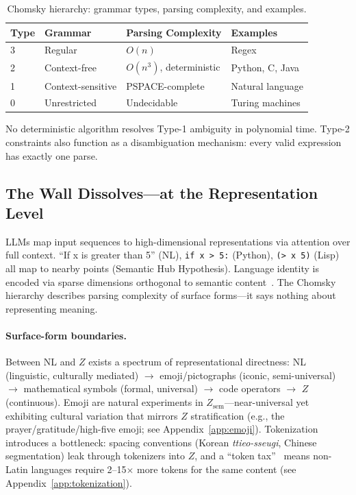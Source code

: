 \documentclass[11pt]{article}
\theoremstyle{definition}
\newcommand{\Zsem}{Z_{\text{sem}}}
\begin{document}
\begin{table}[t]
\centering
\caption{Chomsky hierarchy: grammar types, parsing complexity, and examples.}
\label{tab:chomsky}
\small
\begin{tabular}{llll}
\toprule
\textbf{Type} & \textbf{Grammar} & \textbf{Parsing Complexity} & \textbf{Examples} \\
\midrule
3 & Regular & $O(n)$ & Regex \\
2 & Context-free & $O(n^3)$, deterministic & Python, C, Java \\
1 & Context-sensitive & PSPACE-complete & Natural language \\
0 & Unrestricted & Undecidable & Turing machines \\
\bottomrule
\end{tabular}
\end{table}

No deterministic algorithm resolves Type-1 ambiguity in polynomial time. Type-2 constraints also function as a disambiguation mechanism: every valid expression has exactly one parse.

\subsection{The Wall Dissolves---at the Representation Level}

LLMs map input sequences to high-dimensional representations via attention over full context. ``If x is greater than 5'' (NL), \texttt{if x > 5:} (Python), \texttt{(> x 5)} (Lisp) all map to nearby points (Semantic Hub Hypothesis). Language identity is encoded via sparse dimensions orthogonal to semantic content~\cite{zhong2025sparse}. The Chomsky hierarchy describes parsing complexity of surface forms---it says nothing about representing meaning.

\paragraph{Surface-form boundaries.}
Between NL and $Z$ exists a spectrum of representational directness: NL (linguistic, culturally mediated) $\to$ emoji/pictographs (iconic, semi-universal) $\to$ mathematical symbols (formal, universal) $\to$ code operators $\to$ $Z$ (continuous). Emoji are natural experiments in $\Zsem$---near-universal yet exhibiting cultural variation that mirrors $Z$ stratification (e.g., the prayer/gratitude/high-five emoji; see Appendix~\ref{app:emoji}). Tokenization introduces a bottleneck: spacing conventions (Korean \emph{ttieo-sseugi}, Chinese segmentation) leak through tokenizers into $Z$, and a ``token tax''~\cite{petrov2024tokenizers} means non-Latin languages require 2--15$\times$ more tokens for the same content (see Appendix~\ref{app:tokenization}).
\end{document}
